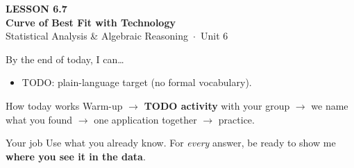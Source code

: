 \documentclass[aspectratio=169, 11pt]{beamer}
\begin{document}
{
\begin{frame}[plain]
  \vspace{2.8cm}\hspace{0.55cm}%
  \begin{minipage}{0.9\textwidth}
    {\color{goldacc}\bfseries\small LESSON 6.7}\\[0.5cm]
    {\color{white}\bfseries\LARGE Curve of Best Fit with Technology}\\[1.2cm]
    {\color{frostmid}\small Statistical Analysis \& Algebraic Reasoning~$\cdot$~Unit 6}
  \end{minipage}
\end{frame}
}

\newcommand{\redink}[1]{{\color{redacc}\bfseries #1}}

\begin{frame}[t, plain]
  By the end of today, I can\ldots
  \begin{itemize}\setlength{\itemsep}{6pt}
    \item TODO: plain-language target (no formal vocabulary).
  \end{itemize}
  \begin{block}{How today works}
    Warm-up $\to$ \textbf{TODO activity} with your group $\to$ we name what you found $\to$
    one application together $\to$ practice.
  \end{block}
\end{frame}

\begin{frame}[t, plain]
\end{frame}

\begin{frame}[t, plain]
  \begin{block}{Your job}
    Use what you already know. For \emph{every} answer, be ready to show me
    \textbf{where you see it in the data}.
  \end{block}
\end{frame}
\end{document}
